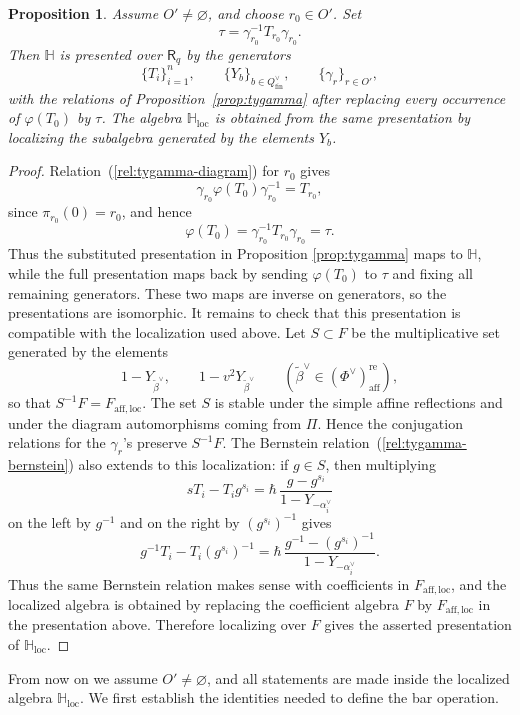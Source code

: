 \documentclass{amsart}
\newcommand{\Ring}{\mathsf{R}}
\newtheorem{Prop}[Thm]{Proposition}
\theoremstyle{definition}
\numberwithin{equation}{section}
\begin{document}
\begin{Prop}\label{prop:levelzero-generators}
Assume $O'\neq\varnothing$, and choose \(r_0\in O'\). Set
\[
\tau=\gamma_{r_0}^{-1}T_{r_0}\gamma_{r_0}.
\]
Then $\mathbb H$ is presented over $\Ring_q$ by the generators
\[
\{T_i\}_{i=1}^n,\qquad \{Y_b\}_{b\in Q_{\mathrm{fin}}^\vee},\qquad \{\gamma_r\}_{r\in O'},
\]
with the relations of Proposition~\ref{prop:tygamma} after replacing every
occurrence of \(\varphi(T_0)\) by \(\tau\).
The algebra \(\mathbb H_{\mathrm{loc}}\) is obtained from the same
presentation by localizing the subalgebra generated by the elements $Y_b$.
\end{Prop}
\begin{proof}
Relation~(\ref{rel:tygamma-diagram})
for \(r_0\) gives
\[
\gamma_{r_0}\varphi(T_0)\gamma_{r_0}^{-1}=T_{r_0},
\]
since \(\pi_{r_0}(0)=r_0\), and hence
\[
\varphi(T_0)=\gamma_{r_0}^{-1}T_{r_0}\gamma_{r_0}=\tau.
\]
Thus the substituted presentation in Proposition \ref{prop:tygamma} maps to \(\mathbb H\), while the full
presentation maps back by sending \(\varphi(T_0)\) to \(\tau\) and fixing all remaining
generators. These two maps are inverse on generators, so the presentations are
isomorphic.
It remains to check that this presentation is compatible with the localization
used above. Let \(S\subset F\) be the multiplicative set generated by the
elements
\[
1-Y_{\widetilde\beta^\vee},\qquad 1-v^2Y_{\widetilde\beta^\vee}
\qquad
(\widetilde\beta^\vee\in(\Phi^\vee)_{\mathrm{aff}}^{\mathrm{re}}),
\]
so that \(S^{-1}F=F_{\mathrm{aff,loc}}\). The set \(S\) is stable under the
simple affine reflections and under the diagram automorphisms coming from
\(\Pi\). Hence the conjugation relations for the \(\gamma_r\)'s preserve
\(S^{-1}F\). The Bernstein relation~(\ref{rel:tygamma-bernstein}) also extends to
this localization: if \(g\in S\), then multiplying
\[
sT_i-T_ig^{s_i}
=
\hbar\,\frac{g-g^{s_i}}{1-Y_{-\alpha_i^\vee}}
\]
on the left by \(g^{-1}\) and on the right by \((g^{s_i})^{-1}\) gives
\[
g^{-1}T_i-T_i(g^{s_i})^{-1}
=
\hbar\,\frac{g^{-1}-(g^{s_i})^{-1}}{1-Y_{-\alpha_i^\vee}}.
\]
Thus the same Bernstein relation makes sense with coefficients in
\(F_{\mathrm{aff,loc}}\), and the localized algebra is obtained by replacing
the coefficient algebra \(F\) by \(F_{\mathrm{aff,loc}}\) in the presentation
above. Therefore localizing over \(F\) gives the asserted presentation of
\(\mathbb H_{\mathrm{loc}}\).
\end{proof}

From now on we assume $O'\neq\varnothing$, and all statements are made inside the localized algebra $\mathbb H_{\mathrm{loc}}$. We first establish the identities needed to define the bar operation.
\end{document}
